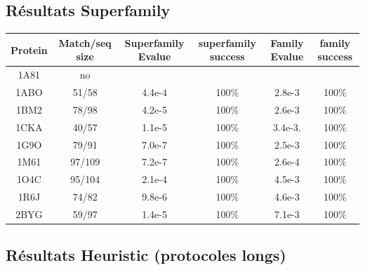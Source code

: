     
    \clearpage



   \subsection{ Résultats Superfamily}


    \begin{table}[h]
           \raggedleft

      \begin{tabular}{|c|c|c|c|c|c|}

        \hline
        Protein & Match/seq size & Superfamily Evalue & superfamily success & Family Evalue & family success\\
        \hline
        1A81 & no & & & & \\
        1ABO & 51/58 & 4.4e-4 & 100\% & 2.8e-3 & 100\% \\
        1BM2 & 78/98 & 4.2e-5 & 100\% & 2.6e-3 & 100\% \\
        1CKA & 40/57 & 1.1e-5 & 100\% & 3.4e-3. & 100\% \\
        1G9O & 79/91 & 7.0e-7 & 100\% & 2.5e-3 & 100\%  \\
        1M61 & 97/109 & 7.2e-7 & 100\% & 2.6e-4 &  100\% \\
        1O4C & 95/104 & 2.1e-4 & 100\% & 4.5e-3 &  100\% \\
        1R6J & 74/82 & 9.8e-6 & 100\% & 4.6e-3 &  100\% \\
        2BYG & 59/97 & 1.4e-5 & 100\% & 7.1e-3 &  100\% \\

        \hline


 \end{tabular}      


 \label{tab_echec2BYG__1}       
\end{table}



    \clearpage



   \subsection{ Résultats Heuristic (protocoles longs)}


